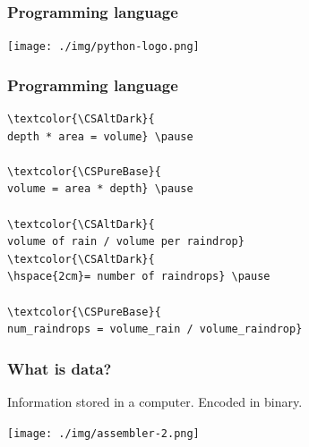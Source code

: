 \documentclass[11pt]{beamer}
\begin{document}
\begin{frame}[fragile]
  \frametitle{Programming language}

  \texttt{[image: ./img/python-logo.png]} \hfill\\
  \hspace{5mm}{\small Python (logo)}
\end{frame}


\begin{frame}[fragile]
  \frametitle{Programming language}
  \Enlarge
  \begin{Verbatim}[commandchars=\\\{\}]
\textcolor{\CSAltDark}{
depth * area = volume} \pause

\textcolor{\CSPureBase}{
volume = area * depth} \pause

\textcolor{\CSAltDark}{
volume of rain / volume per raindrop}
\textcolor{\CSAltDark}{
\hspace{2cm}= number of raindrops} \pause

\textcolor{\CSPureBase}{
num_raindrops = volume_rain / volume_raindrop}
  \end{Verbatim}
\end{frame}

\begin{frame}
  \frametitle{What is data?}
  \Enlarge

  \begin{itemize} \pause
    \myitem Information stored in a computer. \pause
    \myitem Encoded in binary.
  \end{itemize}
  \texttt{[image: ./img/assembler-2.png]}
\end{frame}
\end{document}
